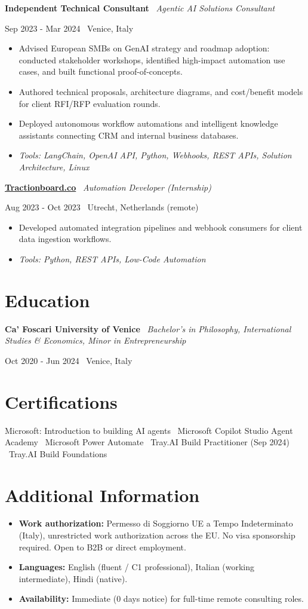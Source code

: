 \documentclass[a4paper,10pt]{article}
\newcommand{\role}[4]{%
  \vspace{2pt}\noindent
  \begin{minipage}[t]{0.70\textwidth}\raggedright\textbf{#1} \textbullet\ \textit{#3}\end{minipage}%
  \hfill
  \begin{minipage}[t]{0.28\textwidth}\raggedleft\footnotesize\color{gray}#2 \textbullet\ #4\end{minipage}%
  \vspace{1pt}%
}
\begin{document}
\role{Independent Technical Consultant}{Sep 2023 - Mar 2024}{Agentic AI Solutions Consultant}{Venice, Italy}
\begin{itemize}
  \item Advised European SMBs on GenAI strategy and roadmap adoption: conducted stakeholder workshops, identified high-impact automation use cases, and built functional proof-of-concepts.
  \item Authored technical proposals, architecture diagrams, and cost/benefit models for client RFI/RFP evaluation rounds.
  \item Deployed autonomous workflow automations and intelligent knowledge assistants connecting CRM and internal business databases.
  \item \textit{Tools: LangChain, OpenAI API, Python, Webhooks, REST APIs, Solution Architecture, Linux}
\end{itemize}

\role{\href{https://tractionboard.co}{Tractionboard.co}}{Aug 2023 - Oct 2023}{Automation Developer (Internship)}{Utrecht, Netherlands (remote)}
\begin{itemize}
  \item Developed automated integration pipelines and webhook consumers for client data ingestion workflows.
  \item \textit{Tools: Python, REST APIs, Low-Code Automation}
\end{itemize}

\section{Education}
\role{Ca' Foscari University of Venice}{Oct 2020 - Jun 2024}{Bachelor's in Philosophy, International Studies \& Economics, Minor in Entrepreneurship}{Venice, Italy}

\section{Certifications}
Microsoft: Introduction to building AI agents \textbullet\ Microsoft Copilot Studio Agent Academy \textbullet\ Microsoft Power Automate \textbullet\ Tray.AI Build Practitioner (Sep 2024) \textbullet\ Tray.AI Build Foundations

\section{Additional Information}
\begin{itemize}
  \item \textbf{Work authorization:} Permesso di Soggiorno UE a Tempo Indeterminato (Italy), unrestricted work authorization across the EU. No visa sponsorship required. Open to B2B or direct employment.
  \item \textbf{Languages:} English (fluent / C1 professional), Italian (working intermediate), Hindi (native).
  \item \textbf{Availability:} Immediate (0 days notice) for full-time remote consulting roles.
\end{itemize}
\end{document}
